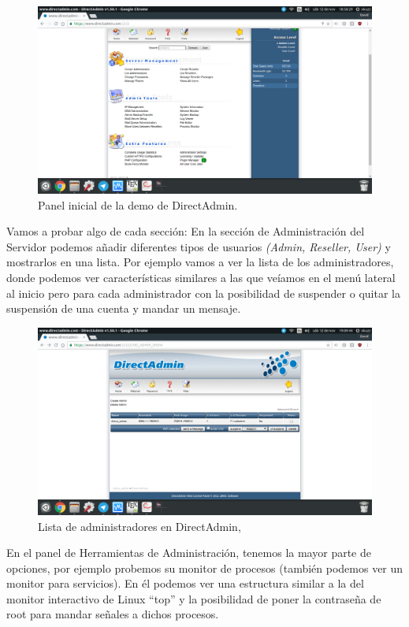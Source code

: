 \begin{flushleft}
\begin{figure}[H]
	\centering
	\includegraphics[scale=0.3]{directadmin.png}
	\caption{Panel inicial de la demo de DirectAdmin.}
\end{figure}

Vamos a probar algo de cada sección: En la sección de Administración del Servidor podemos añadir diferentes tipos de usuarios \textit{(Admin, Reseller, User)} y mostrarlos en una lista.
Por ejemplo vamos a ver la lista de los administradores, donde podemos ver características similares a las que veíamos en el menú lateral al inicio pero para cada administrador con la posibilidad de suspender o quitar la suspensión de una cuenta y mandar un mensaje.

\begin{figure}[H]
	\centering
	\includegraphics[scale=0.3]{directadmin1.png}
	\caption{Lista de administradores en DirectAdmin,}
\end{figure}

En el panel de Herramientas de Administración, tenemos la mayor parte de opciones, por ejemplo probemos su monitor de procesos (también podemos ver un monitor para servicios). En él podemos ver una estructura similar a la del monitor interactivo de Linux ``top'' y la posibilidad de poner la contraseña de root para mandar señales a dichos procesos.


\end{flushleft}
